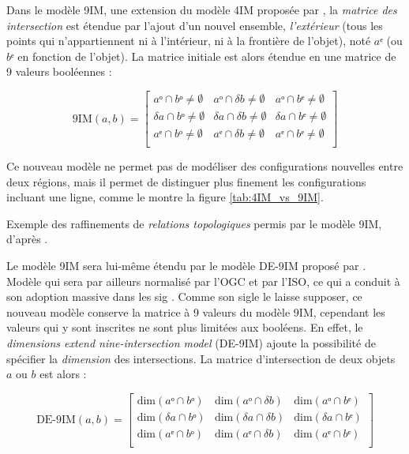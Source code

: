 Dans le modèle 9IM, une extension du modèle 4IM proposée par
\textcite{Egenhofer1991}, la \emph{matrice des intersection} est
étendue par l'ajout d'un nouvel ensemble, \emph{l'extérieur} (\ie tous
les points qui n'appartiennent ni à l'intérieur, ni à la frontière de
l'objet), noté \(aᵉ\) (ou \(bᵉ\) en fonction de l'objet). La matrice
initiale est alors étendue en une matrice de 9 valeurs booléennes :

\begin{equation}
  \label{eq:matrice_9IM}
  \text{9IM}(a,b) =
  \begin{bmatrix}
    aᵒ ∩ bᵒ ≠ ∅ & aᵒ ∩ δb ≠ ∅ & aᵒ ∩ bᵉ ≠ ∅ \\
    δa ∩ bᵒ ≠ ∅ & δa ∩ δb ≠ ∅ & δa ∩ bᵉ ≠ ∅ \\
    aᵉ ∩ bᵒ ≠ ∅ & aᵉ ∩ δb ≠ ∅ & aᵉ ∩ bᵉ ≠ ∅ \\
  \end{bmatrix}
\end{equation}

Ce nouveau modèle ne permet pas de modéliser des configurations
nouvelles entre deux régions, mais il permet de distinguer plus
finement les configurations incluant une ligne, comme le montre la
figure \ref{tab:4IM_vs_9IM}.

\begin{table}
  \centering
  
  \caption{Exemple des raffinements de \emph{relations topologiques}
    permis par le modèle 9IM, d'après \textcite{Egenhofer2011}.}
  \label{tab:4IM_vs_9IM}
\end{table}

Le modèle 9IM sera lui-même étendu par le modèle DE-9IM proposé par
\textcite{Clementini1993}. Modèle qui sera par ailleurs normalisé par
l'OGC et par l'ISO, ce qui a conduit à son adoption massive dans les
\ac{sig} \autocite{Strobl2008}. Comme son sigle le laisse supposer, ce
nouveau modèle conserve la matrice à 9 valeurs du modèle 9IM,
cependant les valeurs qui y sont inscrites ne sont plus limitées aux
booléens. En effet, le \emph{dimensions extend nine-intersection
  model} (DE-9IM) ajoute la possibilité de spécifier la
\emph{dimension} des intersections. La matrice d'intersection de deux
objets \(a\) ou \(b\) est alors :

\begin{equation}
  \label{eq:matrice_DE9IM}
  \text{DE-9IM}(a,b) =
  \begin{bmatrix}
    \text{dim}(aᵒ ∩ bᵒ)&\text{dim}(aᵒ ∩ δb)&\text{dim}(aᵒ ∩ bᵉ)\\
    \text{dim}(δa ∩ bᵒ)&\text{dim}(δa ∩ δb)&\text{dim}(δa ∩ bᵉ)\\
    \text{dim}(aᵉ ∩ bᵒ)&\text{dim}(aᵉ ∩ δb)&\text{dim}(aᵉ ∩ bᵉ)\\
  \end{bmatrix}
\end{equation}

